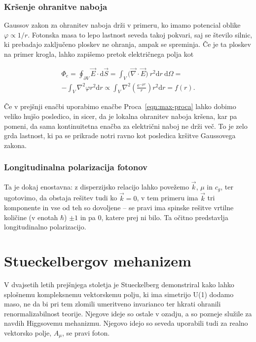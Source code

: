 \documentclass[a4paper, twocolumn, titlepage]{article}
\renewcommand{\div}{
	\ensuremath{\vec{\nabla}\cdot}
}
\newcommand{\ve}{
	\ensuremath{\vec{E}}
}
\renewcommand{\d}{
	\ensuremath{\mathrm{d}}
}
\begin{document}
\subsubsection{Kr\v senje ohranitve naboja}

Gaussov zakon za ohranitev naboja dr\v zi v primeru, ko imamo potencial oblike $\varphi \propto 1/r$. Fotonska masa to
lepo lastnost seveda takoj pokvari, saj se \v stevilo silnic, ki prebadajo zaklju\v ceno ploskev ne ohranja, ampak se
spreminja. \v Ce je ta ploskev na primer krogla, lahko zapi\v semo pretok elektri\v cnega polja kot

\begin{multline*}
	\Phi_e = \oint_{\partial V} \ve \cdot \d \vec{S} = \int_V \big(\div \ve\big)\ r^2\d r\ \d\Omega =\\
		- \int_V \nabla^2\varphi r^2 \d r \propto \int_V \nabla^2 \left(\frac{\text{e}^{-\mu r}}{r}\right)r^2 \d
		r = f(r).
\end{multline*}

\v Ce v prej\v snji ena\v cbi uporabimo ena\v cbe Proca~\eqref{eqn:max-proca} lahko dobimo veliko huj\v so posledico, in
sicer, da je lokalna ohranitev naboja kr\v sena, kar pa pomeni, da sama kontinuitetna ena\v cba za elektri\v cni naboj ne
dr\v zi ve\v c. To je zelo grda lastnost, ki pa se prikrade notri ravno kot posledica kr\v sitve Gaussovega zakona.

\subsubsection{Longitudinalna polarizacija fotonov}

Ta je dokaj enostavna: z disperzijsko relacijo lahko pove\v zemo $\vec{k}$, $\mu$ in $c_g$, ter ugotovimo, da obstaja
re\v sitev tudi ko $\vec{k} = 0$, v tem primeru ima $\vec{k}$ tri komponente in vse od teh so dovoljene -- se pravi ima
spinske re\v sitve vrtilne koli\v cine (v enotah $\hbar$) $\pm 1$ in pa $0$, katere prej ni bilo. Ta o\v citno predstavlja
longitudinalno polarizacijo.

\section{Stueckelbergov mehanizem}

V dvajsetih letih prej\v snjega stoletja je Stueckelberg demonstriral kako lahko splo\v snemu kompleksnemu vektorskemu
polju, ki ima simetrijo U(1) dodamo maso, ne da bi pri tem zlomili umeritveno invarianco ter hkrati ohranili
renormalizabilnost teorije. Njegove ideje so ostale v ozadju, a so pozneje slu\v zile za navdih Higgsovemu mehanizmu.
Njegovo idejo so seveda uporabili tudi za realno vektorsko polje, $A_\mu$, se pravi foton.
\end{document}
